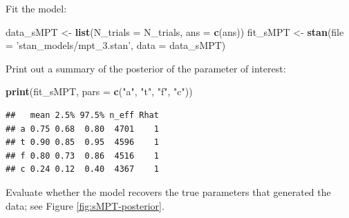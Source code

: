 \documentclass[12pt,]{krantz}
\newenvironment{Shaded}{\begin{snugshade}}{\end{snugshade}}
\newcommand{\DataTypeTok}[1]{\textcolor[rgb]{0.13,0.29,0.53}{#1}}
\newcommand{\DecValTok}[1]{\textcolor[rgb]{0.00,0.00,0.81}{#1}}
\newcommand{\KeywordTok}[1]{\textcolor[rgb]{0.13,0.29,0.53}{\textbf{#1}}}
\newcommand{\NormalTok}[1]{#1}
\newcommand{\OperatorTok}[1]{\textcolor[rgb]{0.81,0.36,0.00}{\textbf{#1}}}
\newcommand{\StringTok}[1]{\textcolor[rgb]{0.31,0.60,0.02}{#1}}
\theoremstyle{definition}
\theoremstyle{definition}
\theoremstyle{definition}
\theoremstyle{remark}
\begin{document}
Fit the model:

\begin{Shaded}
\begin{Highlighting}[]
\NormalTok{data_sMPT <-}\StringTok{  }\KeywordTok{list}\NormalTok{(}\DataTypeTok{N_trials =}\NormalTok{ N_trials,}
                   \DataTypeTok{ans =} \KeywordTok{c}\NormalTok{(ans)) }
\NormalTok{fit_sMPT <-}\StringTok{ }\KeywordTok{stan}\NormalTok{(}\DataTypeTok{file =} \StringTok{'stan_models/mpt_3.stan'}\NormalTok{, }\DataTypeTok{data =}\NormalTok{ data_sMPT)  }
\end{Highlighting}
\end{Shaded}

Print out a summary of the posterior of the parameter of interest:

\begin{Shaded}
\begin{Highlighting}[]
\KeywordTok{print}\NormalTok{(fit_sMPT, }\DataTypeTok{pars =} \KeywordTok{c}\NormalTok{(}\StringTok{"a"}\NormalTok{, }\StringTok{"t"}\NormalTok{, }\StringTok{"f"}\NormalTok{, }\StringTok{"c"}\NormalTok{))}
\end{Highlighting}
\end{Shaded}

\begin{verbatim}
##   mean 2.5% 97.5% n_eff Rhat
## a 0.75 0.68  0.80  4701    1
## t 0.90 0.85  0.95  4596    1
## f 0.80 0.73  0.86  4516    1
## c 0.24 0.12  0.40  4367    1
\end{verbatim}

Evaluate whether the model recovers the true parameters that generated the data; see Figure \ref{fig:sMPT-posterior}.

\begin{Shaded}
\end{Shaded}
\end{document}
